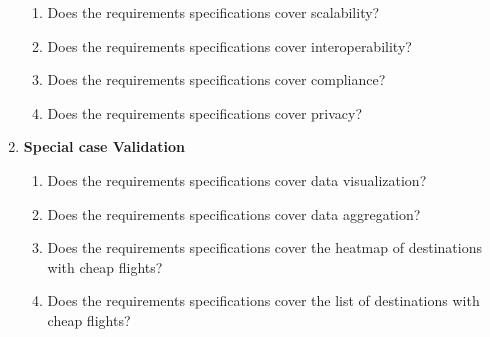 \begin{enumerate}
\begin{enumerate}
        \item Does the requirements specifications cover scalability?
        \item Does the requirements specifications cover interoperability?
        \item Does the requirements specifications cover compliance?
        \item Does the requirements specifications cover privacy?
    \end{enumerate}
    \item \textbf{Special case Validation}
    \begin{enumerate}
        \item Does the requirements specifications cover data visualization?
        \item Does the requirements specifications cover data aggregation?
        \item Does the requirements specifications cover the heatmap of destinations with cheap flights?
        \item Does the requirements specifications cover the list of destinations with cheap flights?
    \end{enumerate}
\end{enumerate}